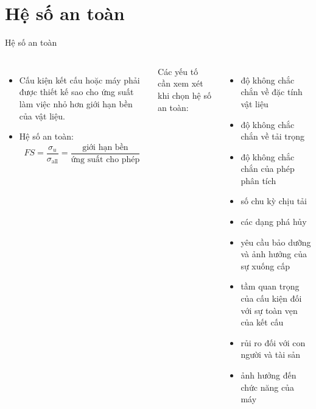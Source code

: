\documentclass[aspectratio=169]{beamer}
\begin{document}
\section{Hệ số an toàn}
\begin{frame}[t]{Hệ số an toàn}
  \begin{columns}[T]
      \small
      \begin{itemize}
        \setlength{\itemsep}{0.6em}
        \item Cấu kiện kết cấu hoặc máy phải được thiết kế sao cho ứng
              suất làm việc nhỏ hơn giới hạn bền của vật liệu.
        \item Hệ số an toàn:
        \[
          FS = \frac{\sigma_u}{\sigma_{\mathrm{all}}}
             = \frac{\text{giới hạn bền}}{\text{ứng suất cho phép}}
        \]
      \end{itemize}
      \small
      Các yếu tố cần xem xét khi chọn hệ số an toàn:
      \begin{itemize}
        \setlength{\itemsep}{0.2em}
        \item độ không chắc chắn về đặc tính vật liệu
        \item độ không chắc chắn về tải trọng
        \item độ không chắc chắn của phép phân tích
        \item số chu kỳ chịu tải
        \item các dạng phá hủy
        \item yêu cầu bảo dưỡng và ảnh hưởng của sự xuống cấp
        \item tầm quan trọng của cấu kiện đối với sự toàn vẹn của kết cấu
        \item rủi ro đối với con người và tài sản
        \item ảnh hưởng đến chức năng của máy
      \end{itemize}
  \end{columns}
\end{frame}
\end{document}
